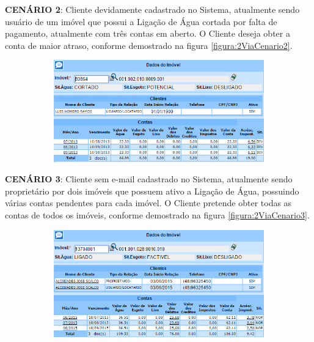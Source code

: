 \begin{flushleft}
	\begin{description}
		\item \textbf{CENÁRIO 2}: Cliente devidamente cadastrado no Sistema, atualmente sendo usuário de um imóvel que possui a Ligação de Água cortada por falta de pagamento, atualmente com três contas em aberto. O Cliente deseja obter a conta de maior atraso, conforme demostrado na figura \ref{figura:2ViaCenario2}.
		\begin{figure}[H]
			\centering
			\caption{\textbf{Obter 2ª via - Cenário de Teste 2}}
			\label{figura:2ViaCenario2}
			\begin{subfigure}[H]{\textwidth}
				\centering
				\includegraphics{figuras/cenarios/segunda_via/cenario_2.PNG}
			\end{subfigure}
		\end{figure}
	\end{description}
	
	\begin{description}
		\item \textbf{CENÁRIO 3}: Cliente sem e-mail cadastrado no Sistema, atualmente sendo proprietário por dois imóveis que possuem ativo a Ligação de Água, possuindo várias contas pendentes para cada imóvel. O Cliente pretende obter todas as contas de todos os imóveis, conforme demostrado na figura \ref{figura:2ViaCenario3}.
		\begin{figure}[H]
			\centering
			\caption{\textbf{Obter 2ª via - Cenário de Teste 3}}
			\label{figura:2ViaCenario3}
			\begin{subfigure}[H]{\textwidth}
				\centering
				\includegraphics{figuras/cenarios/segunda_via/cenario_3.PNG}
				\legend {\fontsize{10}{12}\selectfont {Fonte: Autoria Própria}.}	
			\end{subfigure}
		\end{figure}
	\end{description}
	

\end{flushleft}
